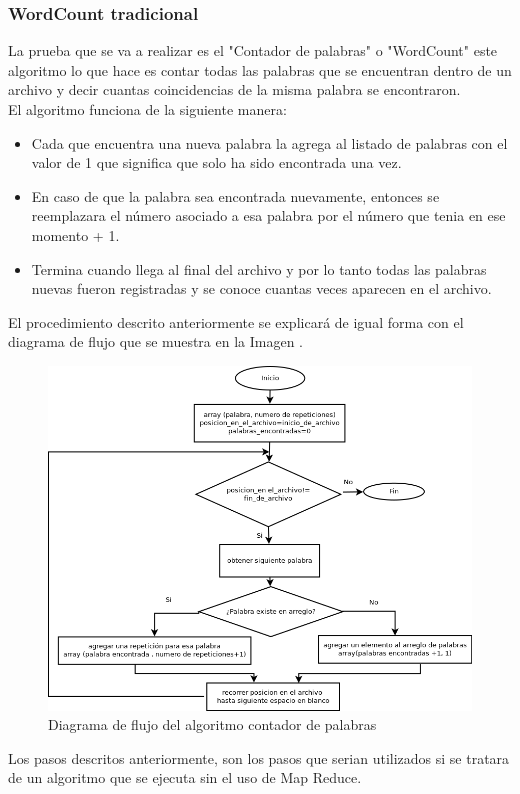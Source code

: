 \subsubsection{WordCount tradicional}
La prueba que se va a realizar es el "Contador de palabras" o "WordCount" este algoritmo lo que hace es contar todas las palabras que se encuentran dentro de un archivo y decir cuantas coincidencias de la misma palabra se encontraron. 
\\ 
El algoritmo funciona de la siguiente manera:
\begin{itemize}
\item Cada que encuentra una nueva palabra la agrega al listado de palabras con el valor de 1 que significa que solo ha sido encontrada una vez.
\item En caso de que la palabra sea encontrada nuevamente, entonces se reemplazara el número asociado a esa palabra por el número que tenia en ese momento + 1.
\item Termina cuando llega al final del archivo y por lo tanto todas las palabras nuevas fueron registradas y se conoce cuantas veces aparecen en el archivo.
\end{itemize} 
El procedimiento descrito anteriormente se explicará de igual forma con el diagrama de flujo que se muestra en la Imagen .

\begin{figure}[!htbp]
	\hypertarget{fig:redi}{\hspace{1pt}}
	\begin{center}
		\includegraphics[width=.7\textwidth]{capitulo4/images/im1.png}
		\caption{Diagrama de flujo del algoritmo contador de palabras}
		\label{fig:redi}
	\end{center}
\end{figure}
Los pasos descritos anteriormente, son los pasos que serian utilizados si se tratara de un algoritmo que se ejecuta sin el uso de Map Reduce.

